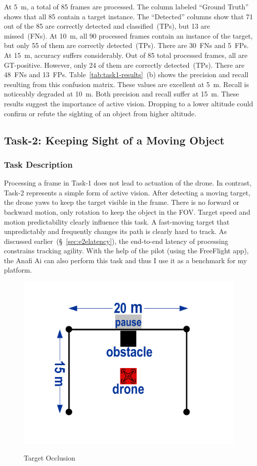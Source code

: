 At 5~m, a total of 85 frames are processed.  The column labeled
``Ground Truth'' shows that all 85 contain a target instance.  The
``Detected'' columns show that 71 out of the 85 are correctly detected
and classified~(TPs), but 13 are missed~(FNs).  At 10~m, all 90
processed frames contain an instance of the target, but only 55 of
them are correctly detected~(TPs).  There are 30~FNs and 5~FPs.  At
15~m, accuracy suffers considerably.  Out of 85 total processed
frames, all are GT-positive.  However, only 24 of them are correctly
detected~(TPs).  There are 48~FNs and 13~FPs.
Table~\ref{tab:task1-results}~(b) shows the precision and recall
resulting from this confusion matrix.  These values are excellent at
5~m.  Recall is noticeably degraded at 10~m.  Both precision and
recall suffer at 15~m.  These results suggest the importance of active
vision. Dropping to a lower altitude could confirm
or refute the sighting of an object from higher altitude. 

\subsection{Task-2: Keeping Sight of  a Moving Object}
\label{sec:task2}

\subsubsection{Task Description}
\label{sec:task2-desc}

Processing a frame in Task-1 does not lead to actuation of the drone.
In contrast, Task-2 represents a simple form of active vision. After
detecting a moving target, the drone yaws to keep the target visible
in the frame. There is no forward or backward motion, only rotation to
keep the object in the FOV.  Target speed and motion predictability
clearly influence this task.  A fast-moving target that unpredictably
and frequently changes its path is clearly hard to track.  As
discussed earlier~(\S~\ref{sec:e2elatency}), the end-to-end latency of
processing constrains tracking agility. With the help of the pilot
(using the FreeFlight app), the Anafi Ai can also perform this task
and thus I use it as a benchmark for my platform.

\begingroup
\setlength{\columnsep}{4pt}
\begin{figure}
\centering
\includegraphics[width=0.4\linewidth]{chapter4/FIGS/fig-yaw-ushape.pdf}\\
\caption{Target Occlusion}
\label{fig:yaw}
\end{figure}

